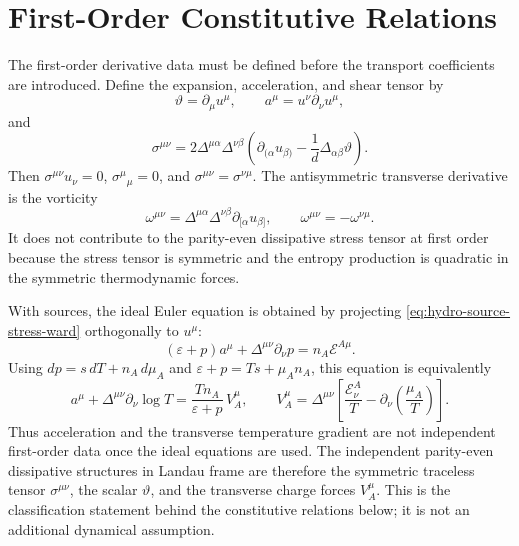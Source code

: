 \section{First-Order Constitutive Relations}

The first-order derivative data must be defined before the transport
coefficients are introduced.  Define the expansion, acceleration, and shear
tensor by
\[
  \vartheta=\partial_\mu u^\mu,
  \qquad
  a^\mu=u^\nu\partial_\nu u^\mu,
\]
and
\begin{equation}
  \sigma^{\mu\nu}
  =
  2\Delta^{\mu\alpha}\Delta^{\nu\beta}
  \left(
  \partial_{(\alpha}u_{\beta)}
  -\frac{1}{d}\Delta_{\alpha\beta}\vartheta
  \right).
  \label{eq:hydro-shear-tensor-definition}
\end{equation}
Then \(\sigma^{\mu\nu}u_\nu=0\), \(\sigma^\mu{}_\mu=0\), and
\(\sigma^{\mu\nu}=\sigma^{\nu\mu}\).
The antisymmetric transverse derivative is the vorticity
\[
  \omega^{\mu\nu}
  =
  \Delta^{\mu\alpha}\Delta^{\nu\beta}
  \partial_{[\alpha}u_{\beta]},
  \qquad
  \omega^{\mu\nu}=-\omega^{\nu\mu}.
\]
It does not contribute to the parity-even dissipative stress tensor at
first order because the stress tensor is symmetric and the entropy
production is quadratic in the symmetric thermodynamic forces.

With sources, the ideal Euler equation is obtained by projecting
\eqref{eq:hydro-source-stress-ward} orthogonally to \(u^\mu\):
\begin{equation}
  (\varepsilon+p)a^\mu+\Delta^{\mu\nu}\partial_\nu p
  =
  n_A\mathcal E^{A\mu}.
  \label{eq:hydro-sourceful-ideal-euler}
\end{equation}
Using \(dp=s\,dT+n_A\,d\mu_A\) and
\(\varepsilon+p=Ts+\mu_A n_A\), this equation is equivalently
\begin{equation}
  a^\mu+\Delta^{\mu\nu}\partial_\nu\log T
  =
  \frac{T n_A}{\varepsilon+p}\,
  V_A^\mu,
  \qquad
  V_A^\mu
  =
  \Delta^{\mu\nu}
  \left[
    \frac{\mathcal E^A_\nu}{T}
    -\partial_\nu\!\left(\frac{\mu_A}{T}\right)
  \right].
  \label{eq:hydro-acceleration-force-reduction}
\end{equation}
Thus acceleration and the transverse temperature gradient are not independent
first-order data once the ideal equations are used.  The independent
parity-even dissipative structures in Landau frame are therefore the
symmetric traceless tensor \(\sigma^{\mu\nu}\), the scalar
\(\vartheta\), and the transverse charge forces \(V_A^\mu\).  This is the
classification statement behind the constitutive relations below; it is not
an additional dynamical assumption.

